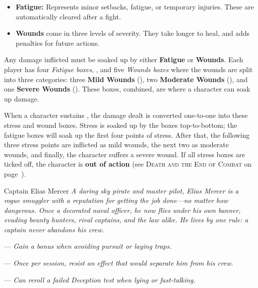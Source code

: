 \begin{WyrdExplanation}
	\begin{itemize}
    	\item \textbf{Fatigue:} Represents minor setbacks, fatigue, or temporary injuries. These are automatically cleared after a fight.
	    \item \textbf{Wounds} come in three levels of severity. They take longer to heal, and adds penalties for future actions.
	\end{itemize}
\end{WyrdExplanation}

Any damage inflicted must be soaked up by either \textbf{Fatigue} or \textbf{Wounds}. Each player has four \emph{Fatigue boxes}, \FatigueBoxes, and five \emph{Wounds boxes} where the wounds are split into three categories: three \textbf{Mild Wounds} (\MildWounds), two \textbf{Moderate Wounds} (\ModerateWounds), and one \textbf{Severe Wounds} (\SevereWounds). These boxes, combined, are where a character can soak up damage.

\DamageBox

When a character sustains \Damage, the damage dealt is converted one-to-one into these stress and wound boxes. Stress is soaked up by the boxes top-to-bottom; the fatigue boxes will soak up the first four points of stress. After that, the following three stress points are inflicted as mild wounds, the next two as moderate wounds, and finally, the character suffers a severe wound. If all stress boxes are ticked off, the character is \textbf{out of action} (see \textsc{Death and the End of Combat} on page~).

\begin{WyrdNPC}[float=!t]{Captain Elias Mercer}
	\emph{A daring sky pirate and master pilot, Elias Mercer is a rogue smuggler with a reputation for getting the job done—no matter how dangerous. Once a decorated naval officer, he now flies under his own banner, evading bounty hunters, rival captains, and the law alike. He lives by one rule: a captain never abandons his crew.}
  
	\vspace{0.5\baselineskip}
	\SkillsBox[%
	  expert={Pilot},%
	  skilled={Shoot, Deception},%
	  novice={Athletics, Awareness, Combat}%
	]
  
	\begin{TraitsBox}
	  \item[Always One Step Ahead] — \emph{Gain a bonus when avoiding pursuit or laying traps.}
	  \item[A Captain Never Abandons His Crew] — \emph{Once per session, resist an effect that would separate him from his crew.}
	  \item[Knows Every Trick in the Book] — \emph{Can reroll a failed Deception test when lying or fast-talking.}
	\end{TraitsBox}
  
	\DamageBox
  \end{WyrdNPC}
  
